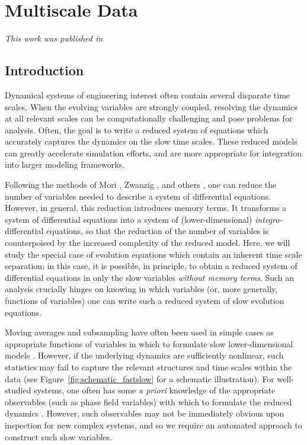 
\chapter{Multiscale Data\label{ch:multiscale}}

\graphicspath{{ch-multiscale/figures/}}

{\em This work was published in \citep{dsilva2015data}}

\section{Introduction}

Dynamical systems of engineering interest often contain several disparate time scales.
%
When the evolving variables are strongly coupled, resolving the
dynamics at all relevant scales can be computationally challenging and pose problems for analysis.
%
Often, the goal is to write a reduced system of equations which accurately captures the dynamics on the slow time scales.
%
These reduced models can greatly accelerate simulation efforts, and are more appropriate for integration into larger modeling frameworks.

Following the methods of Mori \cite{mori1965transport}, Zwanzig \cite{zwanzig1961memory}, and others \cite{brey1981nonlinear, chorin2000optimal, hijon2010mori}, one can reduce the number of variables needed to describe a system of differential equations.
%
However, in general, this reduction introduces memory terms.
%
It transforms a system of differential equations into a system of (lower-dimensional) {\em integro-}differential equations,
so that the reduction of the number of variables is counterpoised by the increased complexity of the  reduced model.
%
Here, we will study the special case of evolution equations which contain an inherent time scale separation;
in this case, it is possible, in principle, to obtain a reduced system of differential equations in only the slow variables {\em without memory terms}.
%
Such an analysis crucially hinges on knowing in which variables (or, more generally, functions of variables) one can write such a reduced system of slow evolution equations.

Moving averages and subsampling have often been used in simple cases as appropriate functions of variables in which to formulate slow lower-dimensional models \cite{pavliotis2007parameter}.
%
However, if the underlying dynamics are sufficiently nonlinear, such statistics may
fail to capture the relevant structures and time scales within the data (see Figure~\ref{fig:schematic_fastslow} for a schematic illustration).
%
For well-studied systems, one often has some {\em a priori} knowledge of the appropriate observables (such as phase field variables) with which to formulate the reduced dynamics \cite{chen2002phase, wheeler1992phase}.
%
However, such observables may not be immediately obvious upon inspection for new complex systems, and so we require an automated approach to construct such slow variables.

